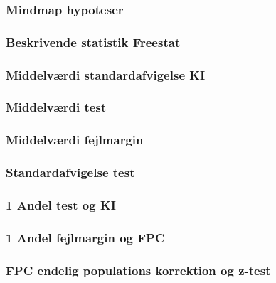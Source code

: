 \documentclass[]{book}
\begin{document}
\hypertarget{mindmap-hypoteser}{%
\subsubsection{Mindmap hypoteser}\label{mindmap-hypoteser}}

\hypertarget{beskrivende-statistik-freestat}{%
\subsubsection{Beskrivende statistik Freestat}\label{beskrivende-statistik-freestat}}

\hypertarget{middelvrdi-standardafvigelse-ki}{%
\subsubsection{Middelværdi standardafvigelse KI}\label{middelvrdi-standardafvigelse-ki}}

\hypertarget{middelvrdi-test}{%
\subsubsection{Middelværdi test}\label{middelvrdi-test}}

\hypertarget{middelvrdi-fejlmargin}{%
\subsubsection{Middelværdi fejlmargin}\label{middelvrdi-fejlmargin}}

\hypertarget{standardafvigelse-test}{%
\subsubsection{Standardafvigelse test}\label{standardafvigelse-test}}

\hypertarget{andel-test-og-ki}{%
\subsubsection{1 Andel test og KI}\label{andel-test-og-ki}}

\hypertarget{andel-fejlmargin-og-fpc}{%
\subsubsection{1 Andel fejlmargin og FPC}\label{andel-fejlmargin-og-fpc}}

\hypertarget{fpc-endelig-populations-korrektion-og-z-test}{%
\subsubsection{FPC endelig populations korrektion og z-test}\label{fpc-endelig-populations-korrektion-og-z-test}}
\end{document}
